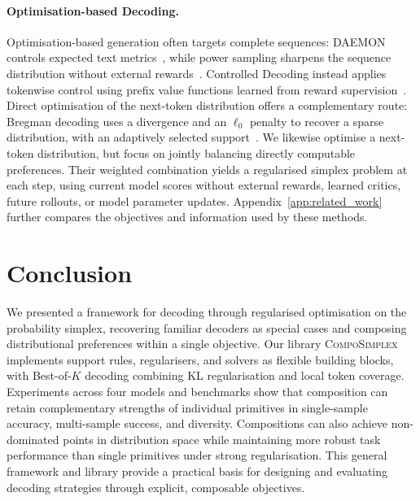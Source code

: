 \documentclass{article} %
\begin{document}
\paragraph{Optimisation-based Decoding.}
Optimisation-based generation often targets complete sequences: DAEMON controls expected text metrics~\citep{ji2024daemon}, while power sampling sharpens the sequence distribution without external rewards~\citep{karan2026reasoning,ji2026scalablepower}.
Controlled Decoding instead applies tokenwise control using prefix value functions learned from reward supervision~\citep{mudgal2023controlled}.
Direct optimisation of the next-token distribution offers a complementary route: Bregman decoding uses a divergence and an $\ell_0$ penalty to recover a sparse distribution, with an adaptively selected support~\citep{noarov2025foundations}.
We likewise optimise a next-token distribution, but focus on jointly balancing directly computable preferences.
Their weighted combination yields a regularised simplex problem at each step, using current model scores without external rewards, learned critics, future rollouts, or model parameter updates.
Appendix~\ref{app:related_work} further compares the objectives and information used by these methods.

\section{Conclusion}
We presented a framework for decoding through regularised optimisation on the probability simplex, recovering familiar decoders as special cases and composing distributional preferences within a single objective.
Our library \textsc{CompoSimplex} implements support rules, regularisers, and solvers as flexible building blocks, with Best-of-$K$ decoding combining KL regularisation and local token coverage.
Experiments across four models and benchmarks show that composition can retain complementary strengths of individual primitives in single-sample accuracy, multi-sample success, and diversity.
Compositions can also achieve non-dominated points in distribution space while maintaining more robust task performance than single primitives under strong regularisation.
This general framework and library provide a practical basis for designing and evaluating decoding strategies through explicit, composable objectives.






\end{document}
